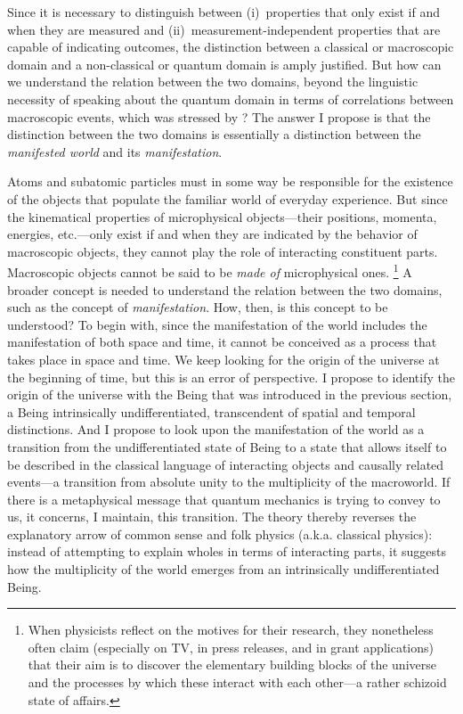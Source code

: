 Since it is necessary to distinguish between (i)~properties that only exist if and when they are measured and (ii)~measurement-independent properties that are capable of indicating outcomes, the distinction between a classical or macroscopic domain and a non-classical or quantum domain is amply justified. But how can we understand the relation between the two domains, beyond the linguistic necessity of speaking about the quantum domain in terms of correlations between macroscopic events, which was stressed by \citet{Bohr1934}? The answer I propose is that the distinction between the two domains is essentially a distinction between the \emph{manifested world} and its \emph{manifestation}.

Atoms and subatomic particles must in some way be responsible for the existence of the objects that populate the familiar world of everyday experience. But since the kinematical properties of microphysical objects---their positions, momenta, energies, etc.---only exist if and when they are indicated by the behavior of macroscopic objects, they cannot play the role of interacting constituent parts. Macroscopic objects cannot be said to be \emph{made of} microphysical ones.%
\footnote{When physicists reflect on the motives for their research, they nonetheless often claim (especially on TV, in press releases, and in grant applications) that their aim is to discover the elementary building blocks of the universe and the processes by which these interact with each other---a rather schizoid state of affairs.}
A broader concept is needed to understand the relation between the two domains, such as the concept of \emph{manifestation}. How, then, is this concept to be understood? To begin with, since the manifestation of the world includes the manifestation of both space and time, it cannot be conceived as a process that takes place in space and time. We keep looking for the origin of the universe at the beginning of time, but this is an error of perspective. I propose to identify the origin of the universe with the Being that was introduced in the previous section, a Being intrinsically undifferentiated, transcendent of spatial and temporal distinctions. And I propose to look upon the manifestation of the world as a transition from the undifferentiated state of Being to a state that allows itself to be described in the classical language of interacting objects and causally related events---a transition from absolute unity to the multiplicity of the macroworld. If there is a metaphysical message that quantum mechanics is trying to convey to us, it concerns, I maintain, this transition. The theory thereby reverses the explanatory arrow of common sense and folk physics (a.k.a. classical physics): instead of attempting to explain wholes in terms of interacting parts, it suggests how the multiplicity of the world emerges from an intrinsically undifferentiated Being. 

